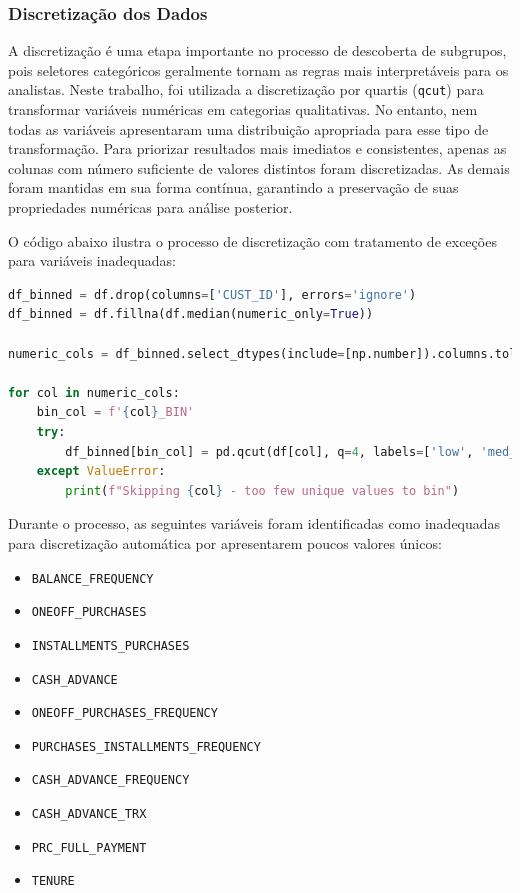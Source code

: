\documentclass[12pt]{article}
\begin{document}
\subsubsection{Discretização dos Dados}

A discretização é uma etapa importante no processo de descoberta de subgrupos, pois seletores categóricos geralmente tornam as regras mais interpretáveis para os analistas. Neste trabalho, foi utilizada a discretização por quartis (\texttt{qcut}) para transformar variáveis numéricas em categorias qualitativas. No entanto, nem todas as variáveis apresentaram uma distribuição apropriada para esse tipo de transformação. Para priorizar resultados mais imediatos e consistentes, apenas as colunas com número suficiente de valores distintos foram discretizadas. As demais foram mantidas em sua forma contínua, garantindo a preservação de suas propriedades numéricas para análise posterior.

O código abaixo ilustra o processo de discretização com tratamento de exceções para variáveis inadequadas:

\begin{lstlisting}[language=Python, caption={Discretização automática com quartis para variáveis numéricas.}]
df_binned = df.drop(columns=['CUST_ID'], errors='ignore')
df_binned = df.fillna(df.median(numeric_only=True))

numeric_cols = df_binned.select_dtypes(include=[np.number]).columns.tolist()

for col in numeric_cols:
    bin_col = f'{col}_BIN'
    try:
        df_binned[bin_col] = pd.qcut(df[col], q=4, labels=['low', 'med_low', 'med_high', 'high'])
    except ValueError:
        print(f"Skipping {col} - too few unique values to bin")
\end{lstlisting}

Durante o processo, as seguintes variáveis foram identificadas como inadequadas para discretização automática por apresentarem poucos valores únicos:

\begin{itemize}
    \item \texttt{BALANCE\_FREQUENCY}
    \item \texttt{ONEOFF\_PURCHASES}
    \item \texttt{INSTALLMENTS\_PURCHASES}
    \item \texttt{CASH\_ADVANCE}
    \item \texttt{ONEOFF\_PURCHASES\_FREQUENCY}
    \item \texttt{PURCHASES\_INSTALLMENTS\_FREQUENCY}
    \item \texttt{CASH\_ADVANCE\_FREQUENCY}
    \item \texttt{CASH\_ADVANCE\_TRX}
    \item \texttt{PRC\_FULL\_PAYMENT}
    \item \texttt{TENURE}
\end{itemize}
\end{document}
